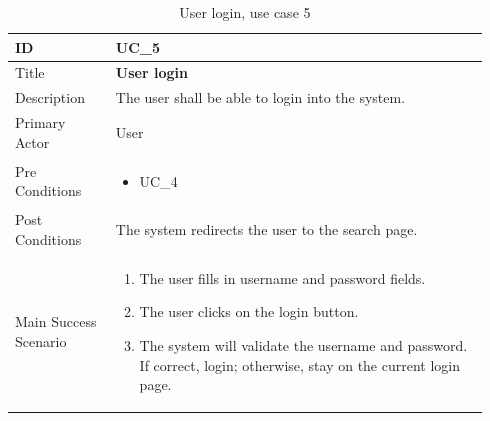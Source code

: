 \documentclass{scrartcl}
\begin{document}
\begin{table}[H]
  \caption{User login, use case 5}
  \begin{tabular}{p{0.20\linewidth} | p{0.74\linewidth}}
    \toprule
    ID & UC\_5
    \\\midrule
    Title & \textbf{User login}
    \\\hline
    Description & The user shall be able to login into the system.
    \\\hline
    Primary Actor & User
    \\\hline
    Pre Conditions & {
                     \begin{itemize}
                     \item UC\_4
                     \end{itemize}
                     }\vspace*{-\baselineskip}
    \\\hline
    Post Conditions & The system redirects the user to the search page.
    \\\hline
    Main Success Scenario & {
                            \begin{enumerate}
                            \item The user fills in username and password fields.
                            \item The user clicks on the login button.
                            \item The system will validate the username and password. If correct, login; otherwise, stay on the current login page.
                            \end{enumerate}
                            }\vspace*{-\baselineskip}
    \\\bottomrule
  \end{tabular}
\end{table}
\end{document}
